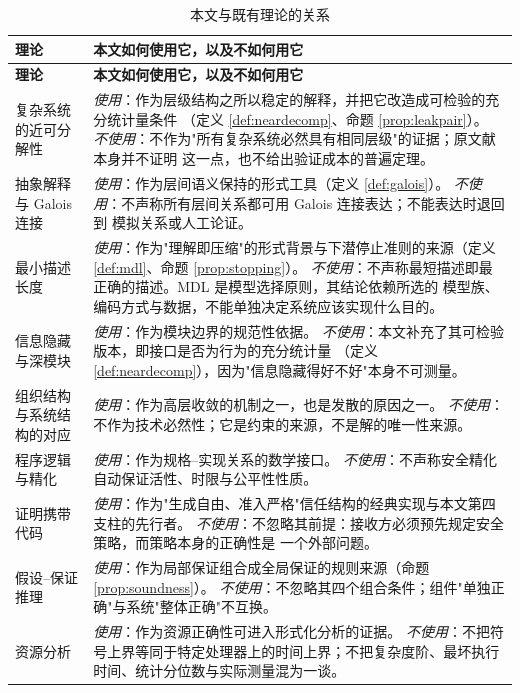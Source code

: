 \begin{longtable}{L{3.6cm}L{10.8cm}}
\caption{本文与既有理论的关系}\label{tab:relations}\\
\toprule
\textbf{理论} & \textbf{本文如何使用它，以及不如何用它} \\
\midrule
\endfirsthead
\toprule
\textbf{理论} & \textbf{本文如何使用它，以及不如何用它} \\
\midrule
\endhead
\bottomrule
\endlastfoot
复杂系统的近可分解性 &
  \emph{使用}：作为层级结构之所以稳定的解释，并把它改造成可检验的充分统计量条件
  （定义 \ref{def:neardecomp}、命题 \ref{prop:leakpair}）。
  \emph{不使用}：不作为"所有复杂系统必然具有相同层级"的证据；原文献本身并不证明
  这一点，也不给出验证成本的普遍定理。 \\
抽象解释与 Galois 连接 &
  \emph{使用}：作为层间语义保持的形式工具（定义 \ref{def:galois}）。
  \emph{不使用}：不声称所有层间关系都可用 Galois 连接表达；不能表达时退回到
  模拟关系或人工论证。 \\
最小描述长度 &
  \emph{使用}：作为"理解即压缩"的形式背景与下潜停止准则的来源（定义
  \ref{def:mdl}、命题 \ref{prop:stopping}）。
  \emph{不使用}：不声称最短描述即最正确的描述。MDL 是模型选择原则，其结论依赖所选的
  模型族、编码方式与数据，不能单独决定系统应该实现什么目的。 \\
信息隐藏与深模块 &
  \emph{使用}：作为模块边界的规范性依据。
  \emph{不使用}：本文补充了其可检验版本，即接口是否为行为的充分统计量
  （定义 \ref{def:neardecomp}），因为"信息隐藏得好不好"本身不可测量。 \\
组织结构与系统结构的对应 &
  \emph{使用}：作为高层收敛的机制之一，也是发散的原因之一。
  \emph{不使用}：不作为技术必然性；它是约束的来源，不是解的唯一性来源。 \\
程序逻辑与精化 &
  \emph{使用}：作为规格--实现关系的数学接口。
  \emph{不使用}：不声称安全精化自动保证活性、时限与公平性性质。 \\
证明携带代码 &
  \emph{使用}：作为"生成自由、准入严格"信任结构的经典实现与本文第四支柱的先行者。
  \emph{不使用}：不忽略其前提：接收方必须预先规定安全策略，而策略本身的正确性是
  一个外部问题。 \\
假设--保证推理 &
  \emph{使用}：作为局部保证组合成全局保证的规则来源（命题 \ref{prop:soundness}）。
  \emph{不使用}：不忽略其四个组合条件；组件"单独正确"与系统"整体正确"不互换。 \\
资源分析 &
  \emph{使用}：作为资源正确性可进入形式化分析的证据。
  \emph{不使用}：不把符号上界等同于特定处理器上的时间上界；不把复杂度阶、最坏执行
  时间、统计分位数与实际测量混为一谈。 \\

\end{longtable}
